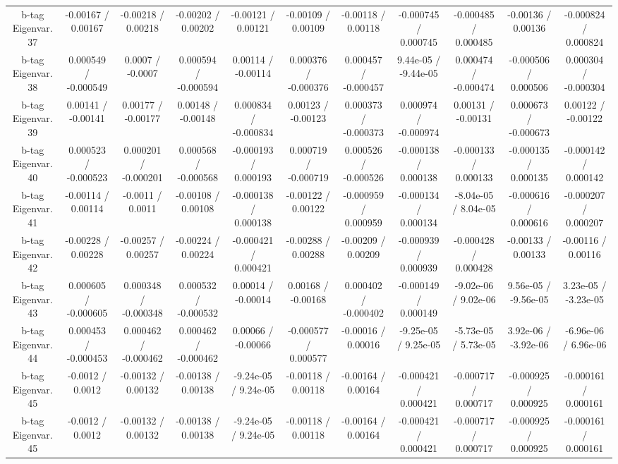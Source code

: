 \begin{table}[htbp]
\begin{center}
\begin{tabular}{|c|c|c|c|c|c|c|c|c|c|c|}
  b-tag Eigenvar. 37 & -0.00167 / 0.00167 & -0.00218 / 0.00218 & -0.00202 / 0.00202 & -0.00121 / 0.00121 & -0.00109 / 0.00109 & -0.00118 / 0.00118 & -0.000745 / 0.000745 & -0.000485 / 0.000485 & -0.00136 / 0.00136 & -0.000824 / 0.000824 \\ 
  b-tag Eigenvar. 38 & 0.000549 / -0.000549 & 0.0007 / -0.0007 & 0.000594 / -0.000594 & 0.00114 / -0.00114 & 0.000376 / -0.000376 & 0.000457 / -0.000457 & 9.44e-05 / -9.44e-05 & 0.000474 / -0.000474 & -0.000506 / 0.000506 & 0.000304 / -0.000304 \\ 
  b-tag Eigenvar. 39 & 0.00141 / -0.00141 & 0.00177 / -0.00177 & 0.00148 / -0.00148 & 0.000834 / -0.000834 & 0.00123 / -0.00123 & 0.000373 / -0.000373 & 0.000974 / -0.000974 & 0.00131 / -0.00131 & 0.000673 / -0.000673 & 0.00122 / -0.00122 \\ 
  b-tag Eigenvar. 40 & 0.000523 / -0.000523 & 0.000201 / -0.000201 & 0.000568 / -0.000568 & -0.000193 / 0.000193 & 0.000719 / -0.000719 & 0.000526 / -0.000526 & -0.000138 / 0.000138 & -0.000133 / 0.000133 & -0.000135 / 0.000135 & -0.000142 / 0.000142 \\ 
  b-tag Eigenvar. 41 & -0.00114 / 0.00114 & -0.0011 / 0.0011 & -0.00108 / 0.00108 & -0.000138 / 0.000138 & -0.00122 / 0.00122 & -0.000959 / 0.000959 & -0.000134 / 0.000134 & -8.04e-05 / 8.04e-05 & -0.000616 / 0.000616 & -0.000207 / 0.000207 \\ 
  b-tag Eigenvar. 42 & -0.00228 / 0.00228 & -0.00257 / 0.00257 & -0.00224 / 0.00224 & -0.000421 / 0.000421 & -0.00288 / 0.00288 & -0.00209 / 0.00209 & -0.000939 / 0.000939 & -0.000428 / 0.000428 & -0.00133 / 0.00133 & -0.00116 / 0.00116 \\ 
  b-tag Eigenvar. 43 & 0.000605 / -0.000605 & 0.000348 / -0.000348 & 0.000532 / -0.000532 & 0.00014 / -0.00014 & 0.00168 / -0.00168 & 0.000402 / -0.000402 & -0.000149 / 0.000149 & -9.02e-06 / 9.02e-06 & 9.56e-05 / -9.56e-05 & 3.23e-05 / -3.23e-05 \\ 
  b-tag Eigenvar. 44 & 0.000453 / -0.000453 & 0.000462 / -0.000462 & 0.000462 / -0.000462 & 0.00066 / -0.00066 & -0.000577 / 0.000577 & -0.00016 / 0.00016 & -9.25e-05 / 9.25e-05 & -5.73e-05 / 5.73e-05 & 3.92e-06 / -3.92e-06 & -6.96e-06 / 6.96e-06 \\ 
  b-tag Eigenvar. 45 & -0.0012 / 0.0012 & -0.00132 / 0.00132 & -0.00138 / 0.00138 & -9.24e-05 / 9.24e-05 & -0.00118 / 0.00118 & -0.00164 / 0.00164 & -0.000421 / 0.000421 & -0.000717 / 0.000717 & -0.000925 / 0.000925 & -0.000161 / 0.000161 \\ 
  b-tag Eigenvar. 45 & -0.0012 / 0.0012 & -0.00132 / 0.00132 & -0.00138 / 0.00138 & -9.24e-05 / 9.24e-05 & -0.00118 / 0.00118 & -0.00164 / 0.00164 & -0.000421 / 0.000421 & -0.000717 / 0.000717 & -0.000925 / 0.000925 & -0.000161 / 0.000161 \\ 

\end{tabular}
\end{center}
\end{table}
